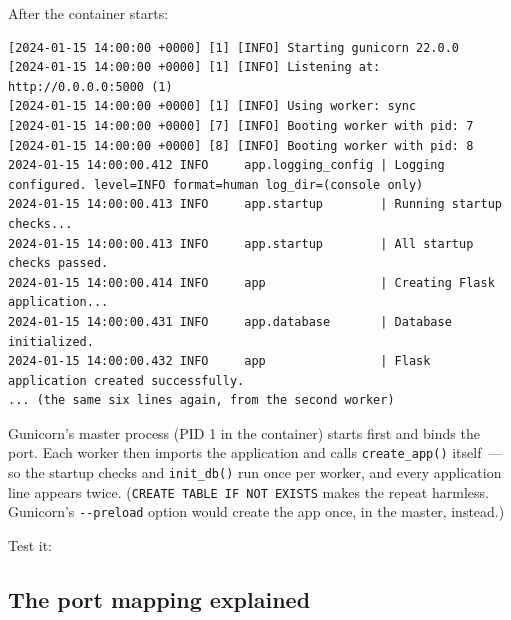 After the container starts:

\begin{outputbox}[short]
\begin{Verbatim}[fontsize=\codesize, breaklines, breakanywhere, breaksymbolleft={\tiny\textcolor{muted}{$\hookrightarrow$}}]
[2024-01-15 14:00:00 +0000] [1] [INFO] Starting gunicorn 22.0.0
[2024-01-15 14:00:00 +0000] [1] [INFO] Listening at: http://0.0.0.0:5000 (1)
[2024-01-15 14:00:00 +0000] [1] [INFO] Using worker: sync
[2024-01-15 14:00:00 +0000] [7] [INFO] Booting worker with pid: 7
[2024-01-15 14:00:00 +0000] [8] [INFO] Booting worker with pid: 8
2024-01-15 14:00:00.412 INFO     app.logging_config | Logging configured. level=INFO format=human log_dir=(console only)
2024-01-15 14:00:00.413 INFO     app.startup        | Running startup checks...
2024-01-15 14:00:00.413 INFO     app.startup        | All startup checks passed.
2024-01-15 14:00:00.414 INFO     app                | Creating Flask application...
2024-01-15 14:00:00.431 INFO     app.database       | Database initialized.
2024-01-15 14:00:00.432 INFO     app                | Flask application created successfully.
... (the same six lines again, from the second worker)
\end{Verbatim}
\end{outputbox}

\noindent{}Gunicorn's master process (PID 1 in the container) starts first and binds the port. Each worker then imports the application and calls \texttt{create\_app()} itself~--- so the startup checks and \texttt{init\_db()} run once per worker, and every application line appears twice. (\texttt{CREATE\ TABLE\ IF\ NOT\ EXISTS} makes the repeat harmless. Gunicorn's \texttt{-\/-preload} option would create the app once, in the master, instead.)

Test it:

\begin{codebox}[short]

\begin{Shaded}
\begin{Highlighting}[]
\end{Highlighting}
\end{Shaded}

\end{codebox}

\subsection*{The port mapping explained}\label{18-containerization:the-port-mapping-explained}

